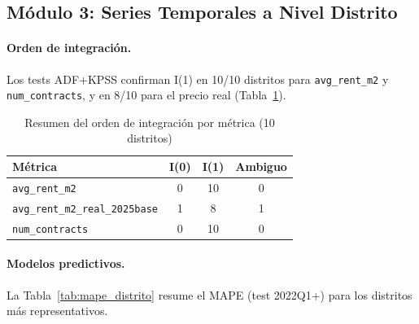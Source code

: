 \documentclass[12pt,a4paper]{article}
\begin{document}
\subsection{Módulo 3: Series Temporales a Nivel Distrito}

\paragraph{Orden de integración.} Los tests ADF+KPSS confirman I(1) en 10/10 distritos
para \texttt{avg\_rent\_m2} y \texttt{num\_contracts}, y en 8/10 para el precio real
(Tabla~\ref{tab:stat_orden}).

\begin{table}[H]
\caption{Resumen del orden de integración por métrica (10 distritos)}
\label{tab:stat_orden}
\centering
\small
\begin{tabular}{lccc}
\toprule
Métrica & I(0) & I(1) & Ambiguo \\
\midrule
\texttt{avg\_rent\_m2} & 0 & 10 & 0 \\
\texttt{avg\_rent\_m2\_real\_2025base} & 1 & 8 & 1 \\
\texttt{num\_contracts} & 0 & 10 & 0 \\
\bottomrule
\end{tabular}
\end{table}

\paragraph{Modelos predictivos.} La Tabla~\ref{tab:mape_distrito} resume el MAPE
(test 2022Q1+) para los distritos más representativos.
\end{document}
